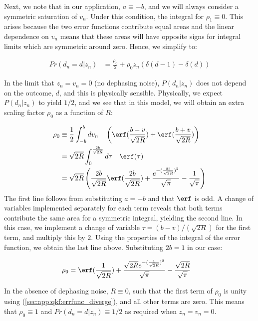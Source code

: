 Next, we note that in our application, $a\equiv -b $, and we will always consider a symmetric saturation of $v_n$. Under this condition, the  integral for $\rho_1 \equiv 0$. This arises because the two error functions contribute equal areas and the linear dependence on $v_n$ means that these areas will have opposite signs for integral limits which are symmetric around zero. Hence, we simplify to:

\begin{align}
Pr(d_n=d | z_n) & =  \frac{\rho_0}{2}  + \rho_0 z_n \left( \delta(d-1) - \delta(d) \right)   \label{eqn:app:proposedquantiser:2} 
\end{align}

In the limit that $z_n=v_n=0$ (no dephasing noise), $P(d_n|z_n)$ does not depend on the outcome, $d$, and this is physically sensible. Physically, we expect $P(d_n|z_n)$ to yield $1/2$, and we see that in this model, we will obtain an extra scaling factor $\rho_0$ as a function of $R$:

\begin{align}
\rho_0 & \equiv  \frac{1}{2}  \int_{-b}^{b} dv_n \quad
\left(\erf(\frac{b-v}{\sqrt{2R}}) + \erf(\frac{b+v}{\sqrt{2R}})\right) \\
& = \sqrt{2R} \int_{0}^{\frac{2b}{\sqrt{2R}}} d\tau \quad \erf(\tau) \\
& = \sqrt{2R} \left( \frac{2b}{\sqrt{2R}} \erf(\frac{2b}{\sqrt{2R}}) + \frac{e^{-(\frac{2b}{\sqrt{2R}})^2}}{\sqrt{\pi}}  - \frac{1}{\sqrt{\pi}}  \right) 
\end{align}
The first line follows from substituting $a=-b$ and that $\erf$ is odd. A change of variables implemented separately for each term reveals that both terms contribute the same area for a symmetric integral, yielding the second line. In this case, we implement a change of variable $\tau = (b-v)/(\sqrt{2R})$ for the first term, and multiply this by $2$. Using the properties of the integral of the error function, we obtain the last line above. Substituting $2b=1$ in our case:

\begin{align}
\rho_0 & = \erf(\frac{1}{\sqrt{2R}}) + \frac{\sqrt{2R} e^{-(\frac{1}{\sqrt{2R}})^2}}{\sqrt{\pi}}  - \frac{\sqrt{2R}}{\sqrt{\pi}}
\end{align}

In the absence of dephasing noise,  $R \equiv 0$, such that the first term of $\rho_0$ is unity using (\cref{sec:app:qkf:errfunc_diverge}), and all other terms are zero.  This means that $\rho_0 \equiv 1 $ and $Pr(d_n=d | z_n) \equiv 1/2$ as required when $z_n=v_n=0$. 

